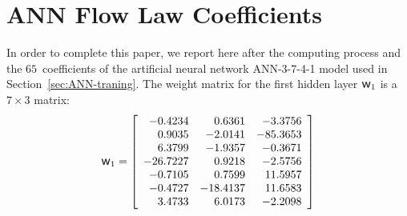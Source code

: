 \documentclass[algorithms,article,accept,pdftex,oneauthors]{Definitions/mdpi}
\DeclareRobustCommand{\w}{\mbox{\large\ensuremath{\mathsf{w}}}}
\begin{document}

\appendixstart
\appendix
\section[\appendixname~\thesection]{ANN Flow Law Coefficients\label{sec:Appendix}}

In order to complete this paper, we report here after the computing process and the $65$~coefficients of the artificial neural network ANN-3-7-4-1 model used in Section~\ref{sec:ANN-traning}.
The weight matrix for the first hidden layer $\w_1$ is a $7\times3$ matrix:
\begin{equation*}
\w_1 = \left[
\begin{array}{rrr}
	-0.4234  & 0.6361   & -3.3756  \\
	0.9035   & -2.0141  & -85.3653 \\
	6.3799   & -1.9357  & -0.3671  \\
	-26.7227 & 0.9218   & -2.5756  \\
	-0.7105  & 0.7599   & 11.5957  \\
	-0.4727  & -18.4137 & 11.6583  \\
	3.4733   & 6.0173   & -2.2098
\end{array}\right]
\end{equation*}
\end{document}
